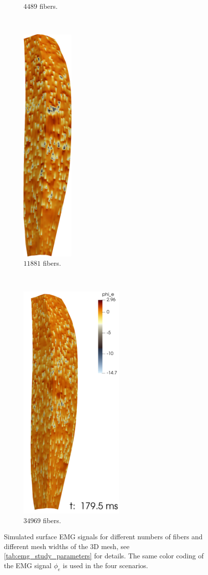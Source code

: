 \begin{figure}
\begin{subfigure}[t]{0.19\textwidth}
    \caption{$4489$ fibers.}%
    \label{fig:emg67}%
  \end{subfigure}  \,
  \begin{subfigure}[t]{0.19\textwidth}%
    \centering%
    \includegraphics[height=12cm]{images/results/application/emg109.png}%
    \caption{$\num{11881}$ fibers.}%
    \label{fig:emg109}%
  \end{subfigure}    \,
  \begin{subfigure}[t]{0.35\textwidth}%
    \centering%
    \includegraphics[height=12cm]{images/results/application/emg187.png}%
    \caption{$\num{34969}$ fibers.}%
    \label{fig:emg187}%
  \end{subfigure}   
  \caption{Simulated surface EMG signals for different numbers of fibers and different mesh widths of the 3D mesh, see \cref{tab:emg_study_parameters} for details. The same color coding of the EMG signal $\phi_e$ is used in the four scenarios.}%
  \label{fig:emg_hpc}%
\end{figure}%

